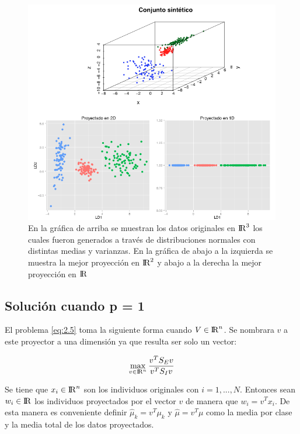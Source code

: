 \begin{figure}[!ht]
  \centering
  \includegraphics[width=1\textwidth]{Figures/Chapter2_1} 
  \caption[Mejores proyecciones en ${\rm I\!R}^{2}$ y ${\rm I\!R}$]
  {En la gráfica de arriba se muestran los datos originales en 
   ${\rm I\!R}^{3}$ los cuales fueron generados a través de distribuciones normales con distintas medias y varianzas. En la gráfica de abajo a la izquierda se muestra la mejor proyección en ${\rm I\!R}^{2}$ y abajo a la derecha la mejor proyección en ${\rm I\!R}$}
\end{figure}

\subsection{Solución cuando p = 1}

El problema \ref{eq:2.5} toma la siguiente forma cuando $V \in {\rm I\!R}^{n}$. Se nombrara $v$ a este proyector a una dimensión ya que resulta ser solo un vector:


\begin{equation} \label{eq:2.9}
\max_{v \in {\rm I\!R}^{n}} \frac{v^T S_E v}{v^T S_I v}  
\end{equation}

Se tiene que $x_i \in {\rm I\!R}^{n}$ son los individuos originales con $i = 1 , ... , N $. Entonces sean $w_i \in {\rm I\!R}$ los individuos proyectados por el vector $v$ de manera que $w_i = v^Tx_i$. De esta manera es conveniente definir $\widehat{\mu}_k = v^T \mu_k$ y $\widehat{\mu} = v^T \mu$ como la media por clase y la media total de los datos proyectados.

